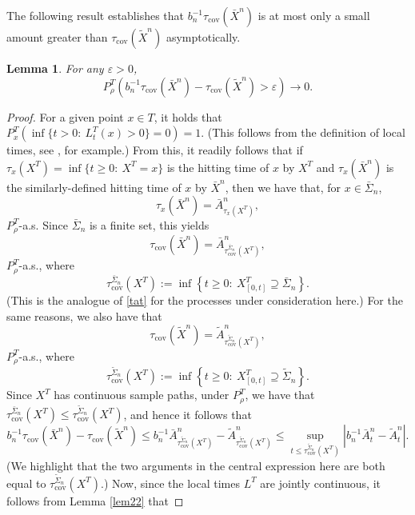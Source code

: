\documentclass[a4paper, 11pt]{article}
\newtheorem{lem}[theorem]{Lemma}
\begin{document}
The following result establishes that $b_n^{-1}\tau_{\mathrm{cov}}(\bar{X}^n)$ is at most only a small amount greater than $\tau_{\mathrm{cov}}(\tilde{X}^n)$ asymptotically.

\begin{lem}\label{lem43} For any $\varepsilon>0$,
\[P^T_{\rho}\left(b_n^{-1}\tau_{\mathrm{cov}}(\bar{X}^n)-\tau_{\mathrm{cov}}(\tilde{X}^n)>\varepsilon\right)\rightarrow 0.\]
\end{lem}
\begin{proof} For a given point $x\in T$, it holds that $P_x^T(\inf\{t>0:\:L^T_t(x)>0\}=0)=1$. (This follows from the definition of local times, see \cite[Definition 4.10]{Noda}, for example.) From this, it readily follows that if $\tau_x(X^T)=\inf\{t\geq 0:\:X^T=x\}$ is the hitting time of $x$ by $X^T$ and $\tau_x(\bar{X}^n)$ is the similarly-defined hitting time of $x$ by $\bar{X}^n$, then we have that, for $x\in\bar\Sigma_n$,
\begin{equation}\label{a1}
\tau_x(\bar{X}^n)=\bar A^n_{\tau_x(X^T)},
\end{equation}
$P_\rho^T$-a.s. Since $\bar\Sigma_n$ is a finite set, this yields
\[\tau_{\mathrm{cov}}(\bar{X}^n)=\bar A^n_{\tau_{\mathrm{cov}}^{\bar{\Sigma}_n}(X^T)},\]
$P_\rho^T$-a.s., where
\[\tau_{\mathrm{cov}}^{\bar{\Sigma}_n}(X^T):=\inf\left\{t\geq 0:\:X^T_{[0,t]}\supseteq \bar{\Sigma}_n\right\}.\]
(This is the analogue of \eqref{tat} for the processes under consideration here.) For the same reasons, we also have that
\begin{equation}\label{twocovs}
\tau_{\mathrm{cov}}(\tilde{X}^n)=\tilde A^n_{\tau_{\mathrm{cov}}^{\tilde{\Sigma}_n}(X^T)},
\end{equation}
$P_\rho^T$-a.s., where
\begin{equation}\label{t2}
\tau_{\mathrm{cov}}^{\tilde{\Sigma}_n}(X^T):=\inf\left\{t\geq 0:\:X^T_{[0,t]}\supseteq \tilde{\Sigma}_n\right\}.
\end{equation}
Since $X^T$ has continuous sample paths, under $P_\rho^T$, we have that $\tau_{\mathrm{cov}}^{\bar{\Sigma}_n}(X^T)\leq \tau_{\mathrm{cov}}^{\tilde{\Sigma}_n}(X^T)$, and hence it follows that
\[b_n^{-1}\tau_{\mathrm{cov}}(\bar{X}^n)-\tau_{\mathrm{cov}}(\tilde{X}^n)\leq b_n^{-1}\bar A^n_{\tau_{\mathrm{cov}}^{\tilde{\Sigma}_n}(X^T)}-\tilde A^n_{\tau_{\mathrm{cov}}^{\tilde{\Sigma}_n}(X^T)}\leq \sup_{t\leq \tau_{\mathrm{cov}}^{\tilde{\Sigma}_n}(X^T)}\left|b_n^{-1}\bar A^n_t-\tilde{A}^n_t\right|.\]
(We highlight that the two arguments in the central expression here are both equal to $\tau_{\mathrm{cov}}^{\tilde{\Sigma}_n}(X^T)$.) Now, since the local times $L^T$ are jointly continuous, it follows from Lemma \ref{lem22} that

\end{proof}
\end{document}
